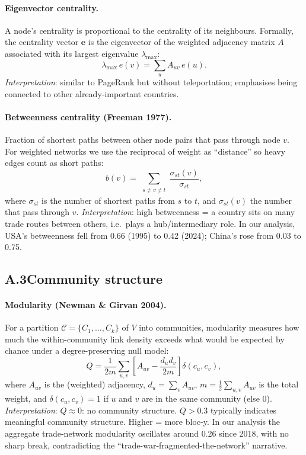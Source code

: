 \documentclass[11pt,a4paper]{article}
\begin{document}
\paragraph{Eigenvector centrality.}
A node's centrality is proportional to the centrality of its neighbours.
Formally, the centrality vector $\mathbf{e}$ is the eigenvector of the
weighted adjacency matrix $A$ associated with its largest eigenvalue
$\lambda_{\max}$:
\[
\lambda_{\max}\, e(v) = \sum_{u} A_{uv}\, e(u).
\]
\emph{Interpretation}: similar to PageRank but without teleportation;
emphasises being connected to other already-important countries.

\paragraph{Betweenness centrality (Freeman 1977).}
Fraction of shortest paths between other node pairs that pass through
node $v$. For weighted networks we use the reciprocal of weight as
``distance'' so heavy edges count as short paths:
\[
b(v) = \sum_{\substack{s \neq v \neq t}} \frac{\sigma_{st}(v)}{\sigma_{st}},
\]
where $\sigma_{st}$ is the number of shortest paths from $s$ to $t$, and
$\sigma_{st}(v)$ the number that pass through $v$.
\emph{Interpretation}: high betweenness = a country sits on many trade
routes between others, i.e.\ plays a hub/intermediary role. In our
analysis, USA's betweenness fell from 0.66 (1995) to 0.42 (2024); China's
rose from 0.03 to 0.75.

\subsection*{A.3\quad Community structure}

\paragraph{Modularity (Newman \& Girvan 2004).}
For a partition $\mathcal{C} = \{C_1, \dots, C_k\}$ of $V$ into communities,
modularity measures how much the within-community link density exceeds
what would be expected by chance under a degree-preserving null model:
\[
Q = \frac{1}{2m} \sum_{u,v}
\left[ A_{uv} - \frac{d_u d_v}{2m} \right]\delta(c_u, c_v),
\]
where $A_{uv}$ is the (weighted) adjacency, $d_u = \sum_v A_{uv}$, $m =
\tfrac{1}{2}\sum_{u,v} A_{uv}$ is the total weight, and $\delta(c_u, c_v)
= 1$ if $u$ and $v$ are in the same community (else $0$).
\emph{Interpretation}: $Q \approx 0$: no community structure. $Q > 0.3$
typically indicates meaningful community structure. Higher = more bloc-y.
In our analysis the aggregate trade-network modularity oscillates around
0.26 since 2018, with no sharp break, contradicting the
``trade-war-fragmented-the-network'' narrative.
\end{document}
